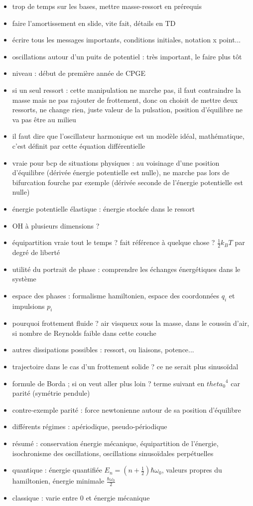 \begin{remarques} \begin{itemize} 
\item trop de temps sur les bases, mettre masse-ressort en prérequis
\item faire l'amortissement en slide, vite fait, détails en TD
\item écrire tous les messages importants, conditions initiales, notation x point...
\item oscillations autour d'un puits de potentiel : très important, le faire plus tôt
\item niveau : début de première année de CPGE
\item si un seul ressort : cette manipulation ne marche pas, il faut contraindre la masse mais ne pas rajouter de frottement, donc on choisit de mettre deux ressorts, ne change rien, juste valeur de la pulsation, position d'équilibre ne va pas être au milieu
\item il faut dire que l'oscillateur harmonique est un modèle idéal, mathématique, c'est définit par cette équation différentielle
\item vraie pour bcp de situations physiques : au voisinage d'une position d'équilibre (dérivée énergie potentielle est nulle), ne marche pas lors de bifurcation fourche par exemple (dérivée seconde de l'énergie potentielle est nulle)
\item énergie potentielle élastique : énergie stockée dans le ressort
\item OH à plusieurs dimensions ?
\item équipartition vraie tout le temps ? fait référence à quelque chose ? $\frac{1}{2} k_B T$ par degré de liberté
\item utilité du portrait de phase : comprendre les échanges énergétiques dans le système
\item espace des phases : formalisme hamiltonien, espace des coordonnées $q_i$ et impulsions $p_i$
\item pourquoi frottement fluide ? air visqueux sous la masse, dans le coussin d'air, si nombre de Reynolds faible dans cette couche
\item autres dissipations possibles : ressort, ou liaisons, potence... 
\item trajectoire dans le cas d'un frottement solide ? ce ne serait plus sinusoïdal
\item formule de Borda ; si on veut aller plus loin ? terme suivant en ${theta_0}^4$ car parité (symétrie pendule)
\item contre-exemple parité : force newtonienne autour de sa position d'équilibre
\item différents régimes : apériodique, pseudo-périodique
\item résumé : conservation énergie mécanique, équipartition de l'énergie, isochronisme des oscillations, oscillations sinusoïdales perpétuelles
\item quantique : énergie quantifiée $E_n=(n+\frac{1}{2}) \hbar \omega_0$, valeurs propres du hamiltonien, énergie minimale $\frac{\hbar \omega_0}{2}$
\item classique : varie entre 0 et énergie mécanique
\end{itemize} \end{remarques}
